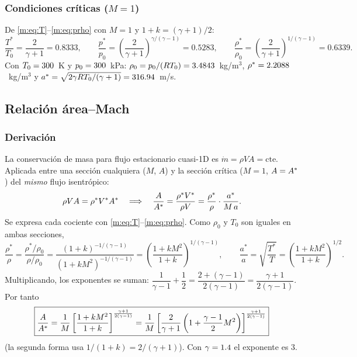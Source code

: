 \subsubsection{Condiciones críticas ($M=1$)}
De \eqref{m:eq:T}--\eqref{m:eq:prho} con $M=1$ y $1+k=(\gamma+1)/2$:
\[
\frac{T^*}{T_0}=\frac{2}{\gamma+1}=0.8333,\qquad
\frac{p^*}{p_0}=\left(\frac{2}{\gamma+1}\right)^{\gamma/(\gamma-1)}=0.5283,\qquad
\frac{\rho^*}{\rho_0}=\left(\frac{2}{\gamma+1}\right)^{1/(\gamma-1)}=0.6339.
\]
Con $T_0=300$~K y $p_0=300$~kPa: $\rho_0=p_0/(RT_0)=3.4843$~kg/m$^3$,
$\rho^*=2.2088$~kg/m$^3$ y $a^*=\sqrt{2\gamma RT_0/(\gamma+1)}=316.94$~m/s.

\subsection{Relación área--Mach}
\subsubsection{Derivación}
La conservación de masa para flujo estacionario cuasi-1D es $\dot m=\rho VA=\text{cte}$. Aplicada entre una sección
cualquiera ($M$, $A$) y la sección crítica ($M=1$, $A=A^{*}$) del \emph{mismo} flujo isentrópico:
\[
\rho V A=\rho^*V^*A^{*}
\quad\Longrightarrow\quad
\frac{A}{A^{*}}=\frac{\rho^*V^*}{\rho V}=\frac{\rho^*}{\rho}\cdot\frac{a^*}{M\,a}.
\]
Se expresa cada cociente con \eqref{m:eq:T}--\eqref{m:eq:prho}. Como $\rho_0$ y $T_0$ son iguales en ambas secciones,
\[
\frac{\rho^*}{\rho}=\frac{\rho^*/\rho_0}{\rho/\rho_0}=\frac{\left(1+k\right)^{-1/(\gamma-1)}}{\left(1+kM^2\right)^{-1/(\gamma-1)}}=\left(\frac{1+kM^2}{1+k}\right)^{1/(\gamma-1)},
\qquad
\frac{a^*}{a}=\sqrt{\frac{T^*}{T}}=\left(\frac{1+kM^2}{1+k}\right)^{1/2}.
\]
Multiplicando, los exponentes se suman: $\dfrac{1}{\gamma-1}+\dfrac12=\dfrac{2+(\gamma-1)}{2(\gamma-1)}=\dfrac{\gamma+1}{2(\gamma-1)}$. Por tanto
\begin{equation}
\boxed{\frac{A}{A^{*}}=\frac{1}{M}\left[\frac{1+kM^2}{1+k}\right]^{\frac{\gamma+1}{2(\gamma-1)}}
=\frac{1}{M}\left[\frac{2}{\gamma+1}\left(1+\frac{\gamma-1}{2}M^2\right)\right]^{\frac{\gamma+1}{2(\gamma-1)}}}\label{m:eq:AM}
\end{equation}
(la segunda forma usa $1/(1+k)=2/(\gamma+1)$). Con $\gamma=1.4$ el exponente es $3$.

